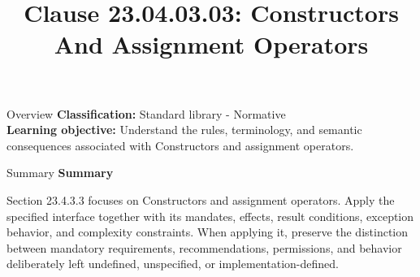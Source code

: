 \documentclass[10pt,letterpaper]{article}
\title{Clause 23.04.03.03: Constructors And Assignment Operators}
\author{}
\date{}
\begin{document}
\maketitle
\begin{CornellOverviewBox}{Overview}
\textbf{Classification:} Standard library - Normative\\[2pt]
\textbf{Learning objective:} Understand the rules, terminology, and semantic consequences associated with Constructors and assignment operators.
\end{CornellOverviewBox}\begin{CornellSummaryBox}{Summary}
{\sffamily\bfseries\color{Accent} Summary}\par\vspace{3pt}Section 23.4.3.3 focuses on Constructors and assignment operators. Apply the specified interface together with its mandates, effects, result conditions, exception behavior, and complexity constraints. When applying it, preserve the distinction between mandatory requirements, recommendations, permissions, and behavior deliberately left undefined, unspecified, or implementation-defined.
\end{CornellSummaryBox}
\end{document}
